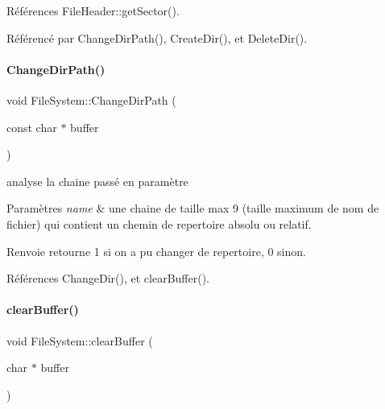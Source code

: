 Références File\+Header\+::get\+Sector().



Référencé par Change\+Dir\+Path(), Create\+Dir(), et Delete\+Dir().

\hypertarget{class_file_system_a1d0a587c40ecb3f5d768ee5faf03e771}{}\label{class_file_system_a1d0a587c40ecb3f5d768ee5faf03e771} 
\paragraph{\texorpdfstring{Change\+Dir\+Path()}{ChangeDirPath()}}
{\footnotesize\ttfamily void File\+System\+::\+Change\+Dir\+Path (\begin{DoxyParamCaption}\item[{const char $\ast$}]{buffer }\end{DoxyParamCaption})}



analyse la chaine passé en paramètre 


\begin{DoxyParams}{Paramètres}
{\em name} & une chaine de taille max 9 (taille maximum de nom de fichier) qui contient un chemin de repertoire absolu ou relatif. \\
\hline
\end{DoxyParams}
\begin{DoxyReturn}{Renvoie}
retourne 1 si on a pu changer de repertoire, 0 sinon. 
\end{DoxyReturn}


Références Change\+Dir(), et clear\+Buffer().

\hypertarget{class_file_system_a0bc2ed13af3e6772c610ad1a8bd0c5aa}{}\label{class_file_system_a0bc2ed13af3e6772c610ad1a8bd0c5aa} 
\paragraph{\texorpdfstring{clear\+Buffer()}{clearBuffer()}}
{\footnotesize\ttfamily void File\+System\+::clear\+Buffer (\begin{DoxyParamCaption}\item[{char $\ast$}]{buffer }\end{DoxyParamCaption})}



